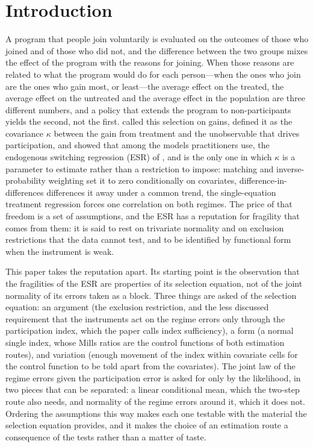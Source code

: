 \documentclass[11pt,a4paper]{article}
\theoremstyle{plain}
\theoremstyle{definition}
\theoremstyle{remark}
\newcommand{\1}{\mathbf{1}}
\begin{document}
\section{Introduction}\label{sec:intro}
A program that people join voluntarily is evaluated on the outcomes
of those who joined and of those who did not, and the difference
between the two groups mixes the effect of the program with the reasons
for joining. When those reasons are related to what the program would
do for each person---when the ones who join are the ones who gain
most, or least---the average effect on the treated, the average effect
on the untreated and the average effect in the population are three
different numbers, and a policy that extends the program to
non-participants yields the second, not the first. \citet{araar2026sog}
called this selection on gains, defined it as the covariance $\kappa$
between the gain from treatment and the unobservable that drives
participation, and showed that among the models practitioners use, the
endogenous switching regression (ESR) of \citet{roy1951},
\citet{heckman1978} and \citet{maddala1983} is the only one in which
$\kappa$ is a parameter to estimate rather than a restriction to
impose: matching and inverse-probability weighting set it to zero
conditionally on covariates, difference-in-differences differences it
away under a common trend, the single-equation treatment regression
forces one correlation on both regimes. The price of that freedom is a
set of assumptions, and the ESR has a reputation for fragility that
comes from them: it is said to rest on trivariate normality and on
exclusion restrictions that the data cannot test, and to be identified
by functional form when the instrument is weak.

This paper takes the reputation apart. Its starting point is the
observation that the fragilities of the ESR are properties of its
selection equation, not of the joint normality of its errors taken as a
block. Three things are asked of the selection equation: an argument
(the exclusion restriction, and the less discussed requirement that the
instruments act on the regime errors only through the participation
index, which the paper calls index sufficiency), a form (a normal
single index, whose Mills ratios are the control functions of both
estimation routes), and variation (enough movement of the index within
covariate cells for the control function to be told apart from the
covariates). The joint law of the regime errors given the participation
error is asked for only by the likelihood, in two pieces that can be
separated: a linear conditional mean, which the two-step route also
needs, and normality of the regime errors around it, which it does not.
Ordering the assumptions this way makes each one testable with the
material the selection equation provides, and it makes the choice of an
estimation route a consequence of the tests rather than a matter of
taste.
\end{document}
